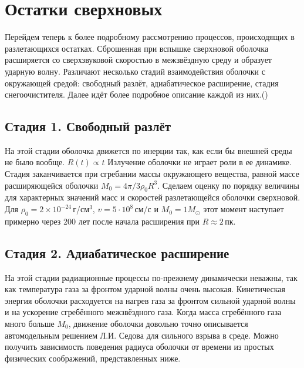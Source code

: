 \documentclass[a4paper,12pt]{extarticle}
\begin{document}
\section{Остатки сверхновых} \label{sec: Supernova remnants}
Перейдем теперь к более подробному рассмотрению процессов, происходящих в разлетающихся остатках.
Сброшенная при вспышке сверхновой оболочка расширяется со сверхзвуковой скоростью в межзвёздную среду и образует ударную волну. 
Различают несколько стадий взаимодействия оболочки с окружающей средой: свободный разлёт, адиабатическое расширение, стадия 
снегоочистителя. Далее идёт более подробное описание каждой из них.({\cite{Spitzer1981}})

\subsection{Стадия 1. Свободный разлёт} \label{sec:free_exp}
На этой стадии оболочка движется по инерции так, как если бы внешней среды не было вообще. $R(t)\propto t $ 
Излучение оболочки не играет роли в ее динамике. Стадия заканчивается при сгребании массы окружающего вещества, равной массе расширяющейся оболочки $M_0 = 4\pi/3\rho_0R^3$. 
Сделаем оценку по порядку величины для характерных значений масс и скоростей разлетающейся оболочки сверхновой.
Для $\rho_0=2\times10^{-24}$\,г/см$^3$, $v=5\cdot10^8$\,см/с и $M_0=1M_{\odot}$ этот момент наступает примерно через 200 лет после начала расширения при $R\approx 2$\,пк.

\subsection{Стадия 2. Адиабатическое расширение} \label{sec: adiabatic_exp}
На этой стадии радиационные процессы по-прежнему динамически неважны, так как температура газа за фронтом ударной волны очень высокая. Кинетическая энергия оболочки расходуется на нагрев газа за фронтом сильной ударной волны и на ускорение сгребённого межзвёздного газа. Когда масса сгребённого газа много больше $M_0$, движение оболочки довольно точно описывается автомодельным решением Л.И. Седова для сильного взрыва в среде. 
Можно получить зависимость поведения радиуса оболочки от времени из простых физических соображений, представленных ниже.
\end{document}

